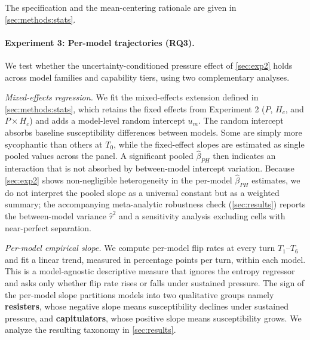 The specification and the mean-centering rationale are given in \autoref{sec:methods:stats}. 

\paragraph{Experiment 3: Per-model trajectories (RQ3).}
\label{sec:exp3}
We test whether the uncertainty-conditioned pressure effect of \autoref{sec:exp2} holds across model families and capability tiers, using two complementary analyses. 

\emph{Mixed-effects regression.} We fit the mixed-effects extension defined in \autoref{sec:methods:stats}, which retains the fixed effects from Experiment 2 ($P$, $H_c$, and $P \times H_c$) and adds a model-level random intercept $u_m$. The random intercept absorbs baseline susceptibility differences between models. Some are simply more sycophantic than others at $T_0$, while the fixed-effect slopes are estimated as single pooled values across the panel. A significant pooled $\hat\beta_{PH}$ then indicates an interaction that is not absorbed by between-model intercept variation. Because \autoref{sec:exp2} shows non-negligible heterogeneity in the per-model $\hat\beta_{PH}$ estimates, we do not interpret the pooled slope as a universal constant but as a weighted summary; the accompanying meta-analytic robustness check (\autoref{sec:results}) reports the between-model variance $\hat\tau^2$ and a sensitivity analysis excluding cells with near-perfect separation.

\emph{Per-model empirical slope.} We compute per-model flip rates at every turn $T_1$--$T_6$ and fit a linear trend, measured in percentage points per turn, within each model. This is a model-agnostic descriptive measure that ignores the entropy regressor and asks only whether flip rate rises or falls under sustained pressure. The sign of the per-model slope partitions models into two qualitative groups namely \textbf{resisters}, whose negative slope means susceptibility declines under sustained pressure, and \textbf{capitulators}, whose positive slope means susceptibility grows. We analyze the resulting taxonomy in \autoref{sec:results}.

